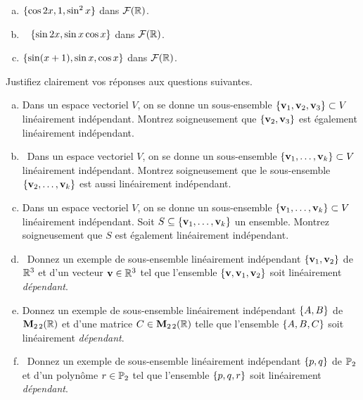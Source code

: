 \begin{prob}
\begin{enumerate}[a)]
\item  $\{\cos 2x, 1,  \sin^2 x\}$ dans  $\mathcal{F}(\mathbb{R})$. \medskip  
 
\item\sov~ $\{\sin 2x, \sin x \cos x \}$ dans  $\mathcal{F}(\mathbb{R})$. \medskip  
 
\item  $\{\sin(x+1), \sin x, \cos x \}$ dans  $\mathcal{F}(\mathbb{R})$. \medskip  
 
\end{enumerate}
\end{prob} \begin{prob} \label{prob07.4} Justifiez clairement vos r\'eponses aux questions suivantes.\medskip 

\begin{enumerate}[a)]
\item Dans un espace vectoriel $V$, on se donne un sous-ensemble $\{\mathbf{v}_1, \mathbf{v}_2 , \mathbf{v}_3\}\subset V$ linéairement indépendant.  Montrez soigneusement que $\{\mathbf{v}_2 , \mathbf{v}_3\}$ est également linéairement indépendant.\medskip

\item\sov~Dans un espace vectoriel $V$, on se donne un sous-ensemble $\{\mathbf{v}_1, \dots , \mathbf{v}_k\}\subset V$ linéairement indépendant. Montrez soigneusement que le sous-ensemble $ \{\mathbf{v}_2, \dots , \mathbf{v}_k\}$ est aussi linéairement indépendant.\medskip
 

\item Dans un espace vectoriel $V$, on se donne un sous-ensemble $\{\mathbf{v}_1, \dots , \mathbf{v}_k\}\subset V$ linéairement indépendant. Soit $S \subseteq \{\mathbf{v}_1, \dots , \mathbf{v}_k\}$ un ensemble. Montrez soigneusement que $S$ est également linéairement indépendant.\medskip
\item\sov~Donnez un exemple de sous-ensemble linéairement indépendant $\{\mathbf{v}_1, \mathbf{v}_2\}$ de $\mathbb{R}^3$ et d'un vecteur $\mathbf{v}\in \mathbb{R}^3$ tel que l'ensemble $\{\mathbf{v}, \mathbf{v}_1, \mathbf{v}_2\}$ soit linéairement {\it dépendant}.
 
\medskip
 

\item Donnez un exemple de sous-ensemble linéairement indépendant $\{A, B\}$ de $\mathbf{M}_{2 \,2}(\mathbb{R})$ et d'une matrice $C\in \mathbf{M}_{2 \,2}(\mathbb{R})$ telle que  l'ensemble $\{A,B,C\}$ soit linéairement {\it dépendant}.\medskip
 

\item\sov~Donnez un exemple de sous-ensemble linéairement indépendant $\{p, q\}$ de $\mathbb{P}_2$ et d'un polynôme $r\in \mathbb{P}_2$ tel que l'ensemble $\{p, q, r\}$ soit linéairement {\it dépendant}.\medskip


\end{enumerate}
\end{prob}
